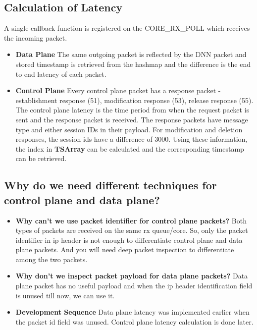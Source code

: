 \subsection{Calculation of Latency}
A single callback function is registered on the CORE\_RX\_POLL which  receives the incoming packet.
\begin{itemize}
	\item \textbf{Data Plane} The same outgoing packet is reflected by the DNN packet and stored timestamp is retrieved from the hashmap and the difference is the end to end latency of each packet.
	\item \textbf{Control Plane} Every control plane packet has a response packet - establishment response (51), modification response (53), release response (55). The control plane latency is the time period from when the request packet is sent and the response packet is received.
	      The response packets have message type and either session IDs in their payload. For
	      modification and deletion  responses, the session ids have a difference of 3000.  Using these information, the index in \textbf{TSArray} can be calculated and the corresponding timestamp can be retrieved.
\end{itemize}
\subsection{Why do we need different techniques for control plane and data plane?}
\begin{itemize}
	\item \textbf{Why can't we use packet identifier for control plane packets?}
	      Both types of packets are received on the same rx queue/core. So, only the packet identifier in ip header is not enough to differentiate control plane and data plane packets. And you will need deep packet inspection to differentiate among the two packets.
	\item \textbf{Why don't we inspect packet payload for data plane packets?} Data plane packet has no useful payload and when the ip header identification field is unused till now, we can use it.
	\item \textbf{Development Sequence}
	      Data plane latency was implemented earlier when the packet id field was unused. Control plane latency calculation is done later.
\end{itemize}

